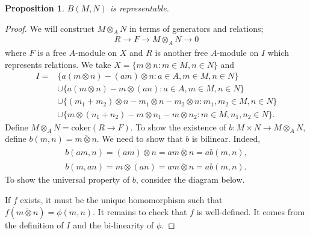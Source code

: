 \documentclass[12pt]{report}
\theoremstyle{plain}
\newtheorem{proposition}[theorem]{Proposition}
\theoremstyle{remark}
\theoremstyle{definition}
\begin{document}
\begin{proposition}
    $B(M,N)$ is representable.
\end{proposition}
\begin{proof}
    We will construct $M\otimes_A N$ in terms of generators and relations;
    \begin{align*}
        R\to F\to M\otimes_A N\to 0
    \end{align*}
    where $F$ is a free $A$-module on $X$ and $R$ is another free $A$-module on $I$ which represents relations. We take $X=\{m\otimes n:m\in M,n\in N\}$ and 
    \begin{align*}
        I= &\{a(m\otimes n)-(am)\otimes n:a\in A,m\in M,n\in N\} \\
        &\cup\{a(m\otimes n)-m\otimes (an):a\in A,m\in M,n\in N\} \\
        &\cup \{(m_1+m_2)\otimes n-m_1\otimes n-m_2\otimes n:m_1,m_2\in M,n\in N\} \\
        &\cup \{m\otimes (n_1+n_2)-m\otimes n_1-m\otimes n_2:m\in M,n_1,n_2\in N\}.
    \end{align*}
    Define $M\otimes_A N=\mathrm{coker}(R\to F)$. To show the existence of $b:M\times N\to M\otimes_A N$, define $b(m,n)=\overline{m\otimes n}$. We need to show that $b$ is bilinear. Indeed,
    \begin{align*}
        b(am,n)=\overline{(am)\otimes n}=a\overline{m\otimes n}=ab(m,n), \\
        b(m,an)=\overline{m\otimes (an)}=a\overline{m\otimes n}=ab(m,n).
    \end{align*}
    To show the universal property of $b$, consider the diagram below.
    \begin{figure}[H]
        \centering
    \end{figure}
    \noindent If $f$ exists, it must be the unique homomorphism such that $f(\overline{m\otimes n})=\phi(m,n)$. It remains to check that $f$ is well-defined. It comes from the definition of $I$ and the bi-linearity of $\phi$.
\end{proof}
\end{document}
